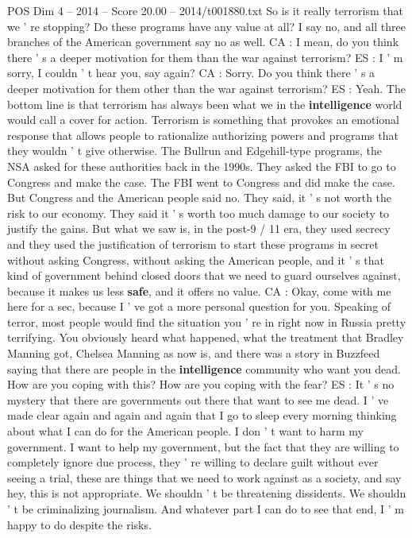 \begin{textsample}{POS Dim 4 – 2014 – Score 20.00 – 2014/t001880.txt}
So is it really terrorism that we ' re stopping?
Do these programs have any value at all?
I say no, and all three branches of the American government say no as well.
CA : I mean, do you think there ' s a deeper motivation for them than the war against terrorism?
ES : I ' m sorry, I couldn ' t hear you, say again?
CA : Sorry.
Do you think there ' s a deeper motivation for them other than the war against terrorism?
ES : Yeah.
The bottom line is that terrorism has always been what we in the \textbf{intelligence} world would call a cover for action.
Terrorism is something that provokes an emotional response that allows people to rationalize authorizing powers and programs that they wouldn ' t give otherwise.
The Bullrun and Edgehill-type programs, the NSA asked for these authorities back in the 1990s.
They asked the FBI to go to Congress and make the case.
The FBI went to Congress and did make the case.
But Congress and the American people said no.
They said, it ' s not worth the risk to our economy.
They said it ' s worth too much damage to our society to justify the gains.
But what we saw is, in the post-9 / 11 era, they used secrecy and they used the justification of terrorism to start these programs in secret without asking Congress, without asking the American people, and it ' s that kind of government behind closed doors that we need to guard ourselves against, because it makes us less \textbf{safe}, and it offers no value.
CA : Okay, come with me here for a sec, because I ' ve got a more personal question for you.
Speaking of terror, most people would find the situation you ' re in right now in Russia pretty terrifying.
You obviously heard what happened, what the treatment that Bradley Manning got, Chelsea Manning as now is, and there was a story in Buzzfeed saying that there are people in the \textbf{intelligence} community who want you dead.
How are you coping with this?
How are you coping with the fear?
ES : It ' s no mystery that there are governments out there that want to see me dead.
I ' ve made clear again and again and again that I go to sleep every morning thinking about what I can do for the American people.
I don ' t want to harm my government.
I want to help my government, but the fact that they are willing to completely ignore due process, they ' re willing to declare guilt without ever seeing a trial, these are things that we need to work against as a society, and say hey, this is not appropriate.
We shouldn ' t be threatening dissidents.
We shouldn ' t be criminalizing journalism.
And whatever part I can do to see that end, I ' m happy to do despite the risks.

\end{textsample}
